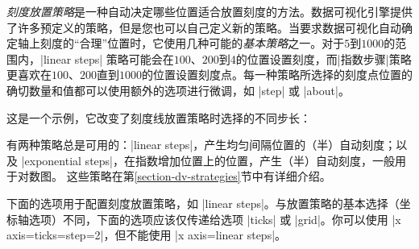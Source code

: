 \emph{刻度放置策略}是一种自动决定哪些位置适合放置刻度的方法。数据可视化引擎提供了许多预定义的策略，但是您也可以自己定义新的策略。当要求数据可视化自动确定轴上刻度的``合理''位置时，它使用几种可能的\emph{基本策略}之一。对于$5$到$1000$的范围内，|linear steps| 策略可能会在$100$、$200$到4的位置设置刻度，而|指数步骤|策略更喜欢在$100$、$200$直到$1000$的位置设置刻度点。每一种策略所选择的刻度点位置的确切数量和值都可以使用额外的选项进行微调，如 |step| 或 |about|。


这是一个示例，它改变了刻度线放置策略时选择的不同步长：
%
\begin{codeexample}[preamble={\usetikzlibrary{datavisualization.formats.functions}}]
\qquad
{}
\end{codeexample}


有两种策略总是可用的：|linear steps|，产生均匀间隔位置的（半）自动刻度；以及 |exponential steps|，在指数增加位置上的位置，产生（半）自动刻度，一般用于对数图。 这些策略在第\ref{section-dv-strategies}节中有详细介绍。


下面的选项用于配置刻度放置策略，如 |linear steps|。与放置策略的基本选择（坐标轴选项）不同，下面的选项应该仅传递给选项 |ticks| 或 |grid|。你可以使用 |x axis={ticks={step=2}}|，但不能使用 |x axis={linear steps}|。

